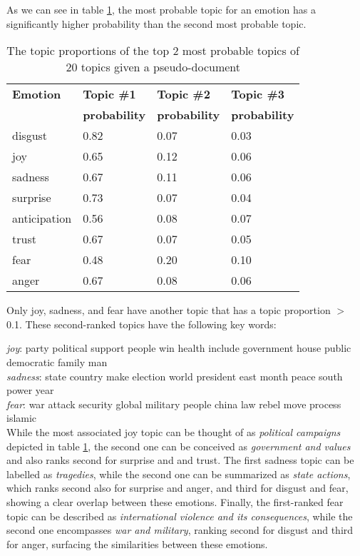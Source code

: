 As we can see in table \ref{tab:topic-proportions}, the most probable topic for an emotion has a significantly higher probability than the second most probable topic.

\begin{table}[]
\centering
\begin{tabular}{l|l|l|l}
{\bf Emotion} & {\bf Topic \#1} & {\bf Topic \#2} & {\bf Topic \#3}\\
& {\bf probability} & {\bf probability} & {\bf probability}\\\hline
disgust & 0.82 & 0.07 & 0.03\\
joy & 0.65 & 0.12 & 0.06\\
sadness & 0.67 & 0.11 & 0.06\\
surprise & 0.73 & 0.07 & 0.04\\
anticipation & 0.56 & 0.08 & 0.07\\
trust & 0.67 & 0.07 & 0.05\\
fear & 0.48 & 0.20 & 0.10\\
anger & 0.67 & 0.08 & 0.06
\end{tabular}
\caption{The topic proportions of the top 2 most probable topics of 20 topics given a pseudo-document}
\label{tab:topic-proportions}
\end{table}

Only joy, sadness, and fear have another topic that has a topic proportion $>$ 0.1. These second-ranked topics have the following key words:

\textit{joy}: party political support people win health include government house public democratic family man\\
\textit{sadness}: state country make election world president east month peace south power year\\
\textit{fear}: war attack security global military people china law rebel move process islamic\\

While the most associated joy topic can be thought of as \textit{political campaigns} depicted in table \ref{tab:topic-proportions}, the second one can be conceived as \textit{government and values} and also ranks second for surprise and and trust. The first sadness topic can be labelled as \textit{tragedies}, while the second one can be summarized as \textit{state actions}, which ranks second also for surprise and anger, and third for disgust and fear, showing a clear overlap between these emotions. Finally, the first-ranked fear topic can be described as \textit{international violence and its consequences}, while the second one encompasses \textit{war and military}, ranking second for disgust and third for anger, surfacing the similarities between these emotions.

